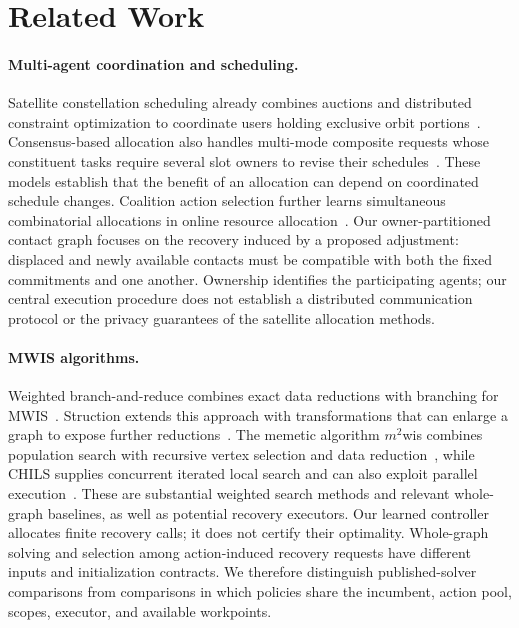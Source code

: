 \section{Related Work}
\label{sec:related}

\paragraph{Multi-agent coordination and scheduling.}
Satellite constellation scheduling already combines auctions and distributed
constraint optimization to coordinate users holding exclusive orbit
portions~\cite{picard2022satellite}. Consensus-based allocation also handles
multi-mode composite requests whose constituent tasks require several slot
owners to revise their schedules~\cite{picard2023composite}. These models
establish that the benefit of an allocation can depend on coordinated
schedule changes. Coalition action selection further learns simultaneous
combinatorial allocations in online resource
allocation~\cite{gebrekidan2024coalition}. Our owner-partitioned contact graph
focuses on the recovery induced by a proposed adjustment: displaced and
newly available contacts must be compatible with both the fixed commitments
and one another. Ownership identifies the participating agents; our central
execution procedure does not establish a distributed communication protocol
or the privacy guarantees of the satellite allocation methods.

\paragraph{MWIS algorithms.}
Weighted branch-and-reduce combines exact data reductions with branching
for MWIS~\cite{lamm2019exact}. Struction extends this approach with
transformations that can enlarge a graph to expose further
reductions~\cite{gellner2021struction}. The memetic algorithm
$m^2$wis combines population search with recursive vertex selection and
data reduction~\cite{grossmann2024mwis}, while CHILS supplies concurrent
iterated local search and can also exploit parallel
execution~\cite{grossmann2025chils}. These are substantial weighted search
methods and relevant whole-graph baselines, as well as potential recovery
executors. Our learned controller allocates finite recovery calls; it does
not certify their optimality. Whole-graph solving and selection among
action-induced recovery requests have different inputs and initialization
contracts. We therefore distinguish published-solver comparisons from
comparisons in which policies share the incumbent, action pool, scopes,
executor, and available workpoints.

